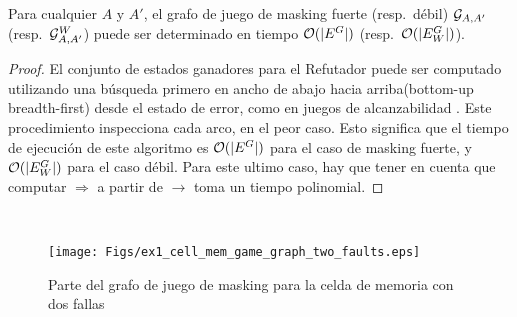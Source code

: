 \begin{theorem}\label{thm:game-determined}
  Para cualquier $A$ y $A'$, el grafo de juego de masking fuerte (resp.\ débil) 
  $\mathcal{G}_{A, A'}$ (resp.\ $\mathcal{G}^W_{A,A'}$) puede ser determinado en tiempo $\mathcal{O}(|E^G|)$ (resp.\ $\mathcal{O}(|E_W^G|)$).
\end{theorem}
\begin{proof}
	El conjunto de estados ganadores para el Refutador puede ser computado utilizando una búsqueda primero en ancho de abajo hacia arriba(bottom-up breadth-first) desde el estado de error, como en juegos de alcanzabilidad \cite{Jurd11}. 
Este procedimiento inspecciona cada arco, en el peor caso. Esto significa que el tiempo de ejecución de este algoritmo es $\mathcal{O}(|E^G|)$ para el caso de masking fuerte, y $\mathcal{O}(|E_W^G|)$ para el caso débil. Para este ultimo caso, hay que tener en cuenta que computar  
$\Rightarrow$ a partir de $\rightarrow$ toma un tiempo polinomial.
\qedhere
\end{proof} \\
\begin{figure} [h]
\begin{center}
    \texttt{[image: Figs/ex1\_cell\_mem\_game\_graph\_two\_faults.eps]} 
    \caption{Parte del grafo de juego de masking para la celda de memoria con dos fallas}
    \label{figure:exam_2_mem_cell_gg_two_faults}
\end{center}
\end{figure}

